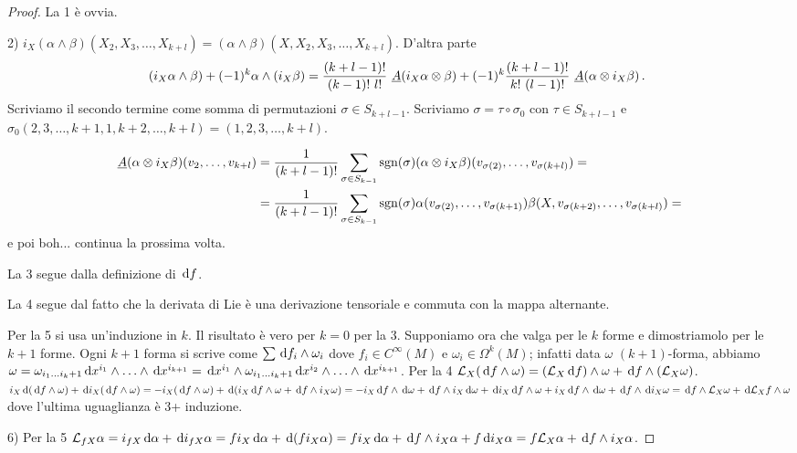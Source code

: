 \begin{proof}
	La 1 è ovvia.
	
	2) $i_X(\alpha \wedge \beta) (X_2,X_3,\ldots,X_{k+l}) = (\alpha\wedge\beta) (X, X_2,X_3,\ldots,X_{k+l})$.
	D'altra parte
	\begin{equation*}
	(i_X\alpha\wedge \beta) + (-1)^k \alpha \wedge (i_X\beta) = \frac{(k+l-1)!}{(k-1)!\ l!}\ \antisimm (i_X\alpha \otimes \beta) + (-1)^k \frac{(k+l-1)!}{k!\ (l-1)!} \ \antisimm (\alpha \otimes i_X\beta) \punto
	\end{equation*}
	Scriviamo il secondo termine come somma di permutazioni $\sigma \in S_{k+l-1}$. Scriviamo $\sigma = \tau \circ \sigma_0$ con $\tau \in S_{k+l-1}$ e $\sigma_0(2,3,\ldots, k+1, 1, k+2, \ldots, k+l) = (1,2,3,\ldots, k+l)$.
	
	\begin{align*}
		\underline{A} (\alpha \otimes i_X\beta) (v_2,\ldots,v_{k+l}) &= \frac 1{(k+l-1)!} \sum_{\sigma\in S_{k-1}}\mathrm{sgn}(\sigma) (\alpha \otimes i_X\beta) (v_{\sigma(2)},\ldots,v_{\sigma(k+l)})=\\
		&= \frac 1{(k+l-1)!} \sum_{\sigma\in S_{k-1}}\mathrm{sgn}(\sigma) \alpha(v_{\sigma(2)},\ldots,v_{\sigma(k+1)})\beta(X,v_{\sigma(k+2)},\ldots,v_{\sigma(k+l)})=
	\end{align*}
	e poi boh... continua la prossima volta.
	
	La 3 segue dalla definizione di $\,\mathrm d f$.
	
	La 4 segue dal fatto che la derivata di Lie è una derivazione tensoriale e commuta con la mappa alternante.
	
	Per la 5 si usa un'induzione in $k$. Il risultato è vero per $k=0$ per la 3. Supponiamo ora che valga per le $k$ forme e dimostriamolo per le $k+1$ forme. Ogni $k+1$ forma si scrive come $\sum \,\mathrm d f_i \wedge \omega_i$ dove $f_i \in C^\infty(M)$ e $\omega_i\in\Omega^k(M)$; infatti data $\omega$ $(k+1)$-forma, abbiamo
	$\omega = \omega_{i_1 \dots  i_k+1} \,\mathrm d x^{i_1} \wedge \ldots \wedge \,\mathrm d x^{i_{k+1}} = \,\mathrm d x^{i_1} \wedge \omega_{i_1 \dots  i_k+1} \,\mathrm d x^{i_2} \wedge \ldots \wedge \,\mathrm d x^{i_{k+1}}$.
	Per la 4 $\mathcal L_X(\,\mathrm d f\wedge\omega) = (\mathcal L_X\,\mathrm d f)\wedge \omega + \,\mathrm d f \wedge (\mathcal L_X\omega)$.
	$i_X\,\mathrm d (\,\mathrm d f\wedge \omega) + \,\mathrm d i_X(\,\mathrm d f \wedge \omega) = -i_X(\,\mathrm d f\wedge \omega) + \,\mathrm d (i_X\,\mathrm d f \wedge \omega + \,\mathrm d f \wedge i_X\omega) =
	-i_X\,\mathrm d f\wedge \,\mathrm d \omega + \,\mathrm d f\wedge i_X \,\mathrm d \omega + \,\mathrm d i_X \,\mathrm d f \wedge \omega + i_X \,\mathrm d f \wedge \,\mathrm d \omega + \,\mathrm d f \wedge \,\mathrm d i_X \omega
	= \,\mathrm d f \wedge \mathcal L_X\omega + \,\mathrm d \mathcal L_Xf \wedge \omega$
	dove l'ultima uguaglianza è 3+ induzione.
	
	6) Per la 5 $\mathcal L_{fX}\alpha = i_{fX} \,\mathrm d \alpha + \,\mathrm d i_{fX} \alpha = f i_X \,\mathrm d \alpha + \,\mathrm d (fi_X\alpha) = f i_X\,\mathrm d \alpha + \,\mathrm d f \wedge i_X\alpha + f \,\mathrm d i_X\alpha = f\mathcal L_X \alpha + \,\mathrm d f \wedge i_X\alpha$.
\end{proof}

